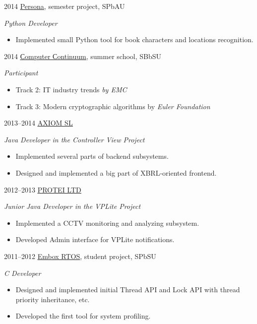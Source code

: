 \documentclass[]{friggeri-cv} %
\begin{document}
\begin{entrylist}
\entry
{2014}
{\href{https://github.com/nunberty/chars-movement-graph}{\underline{Persona}}, semester project, SPbAU}
{}
{\emph{Python Developer}
    \begin{itemize}
        \item
        Implemented small Python tool for book characters and locations recognition.
    \end{itemize}
}
\entry
{2014}
{\href{http://spbsu-school.org/}{\underline{Сomputer Сontinuum}}, summer school, SBbSU}
{}
{\emph{Participant}
    \begin{itemize}
        \item
        Track 2: IT industry trends \textit{by EMC}
        \item
        Track 3: Modern cryptographic algorithms by \textit{Euler Foundation}
    \end{itemize}
}
\entry
{2013--2014}
{\href{http://axiomsl.com}{\underline{AXIOM SL}}}
{}
{\emph{Java Developer in the Controller View Project}

    \begin{itemize}
    \item
        Implemented several parts of backend subsystems.
    \item
        Designed and implemented
        a big part of XBRL-oriented frontend.
    \end{itemize}
}
\entry
{2012--2013}
{\href{http://protei.com}{\underline{PROTEI LTD}}}
{}
{\emph{Junior Java Developer in the VPLite Project}
    \begin{itemize}
        \item
        Implemented a CCTV monitoring and analyzing subsystem.
        \item
        Developed Admin interface for VPLite notifications.
    \end{itemize}
}
\entry
{2011--2012}
{\href{https://code.google.com/p/embox}{\underline{Embox RTOS}}, student project, SPbSU}
{}
{\emph{C Developer}
    \begin{itemize}
        \item
        Designed and implemented initial Thread API and Lock API with thread priority inheritance, etc.
        \item
        Developed the first tool for system profiling.
    \end{itemize}
}
\end{entrylist}
\end{document}
